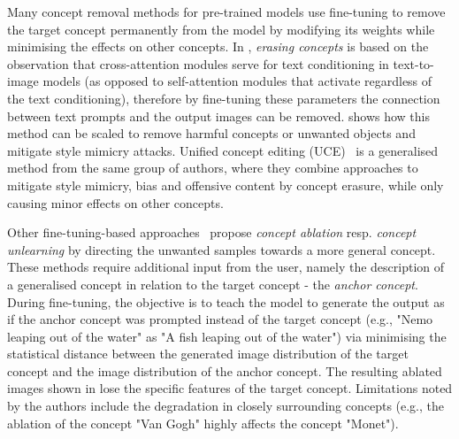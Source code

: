 \documentclass[conference,table]{IEEEtran} %
\begin{document}
Many concept removal methods for pre-trained models use fine-tuning to remove the target concept permanently from the model by modifying its weights while minimising the effects on other concepts.
In \cite{gandikota_erasing_2023}, \textit{erasing concepts} is based on the observation that cross-attention modules serve for text conditioning in text-to-image models (as opposed to self-attention modules that activate regardless of the text conditioning), therefore by fine-tuning these parameters the connection between text prompts and the output images can be removed. 
 shows how this method can be scaled to remove harmful concepts or unwanted objects and mitigate style mimicry attacks.
Unified concept editing (UCE)~\cite{gandikota_unified_2024} is a generalised method from the same group of authors, where they combine approaches to mitigate style mimicry, bias and offensive content by concept erasure, while only causing minor effects on other concepts.   

Other fine-tuning-based approaches~\cite{kumari_ablating_2023,zhang_forget-me-not_2023} propose \textit{concept ablation} resp. \textit{concept unlearning} by directing the unwanted samples towards a more general concept.
These methods require additional input from the user, namely the description of a generalised concept in relation to the target concept - the \textit{anchor concept}. 
During fine-tuning, the objective is to teach the model to generate the output as if the anchor concept was prompted instead of the target concept (e.g., "Nemo leaping out of the water" as "A fish leaping out of the water") via minimising the statistical distance between the generated image distribution of the target concept and the image distribution of the anchor concept.
The resulting ablated images shown in  lose the specific features of the target concept. 
Limitations noted by the authors include the degradation in closely surrounding concepts (e.g., the ablation of the concept "Van Gogh" highly affects the concept "Monet").
\end{document}
